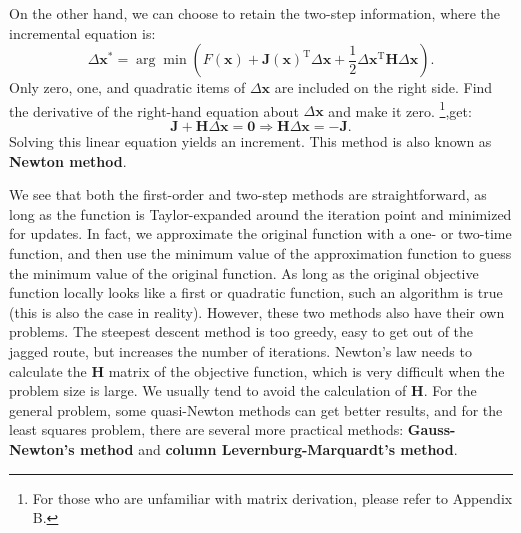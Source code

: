 On the other hand, we can choose to retain the two-step information, where the incremental equation is:
\begin{equation}
\Delta \bm{x}^* = \arg \min \left(F\left( \bm{x} \right) + \bm{J} \left( \bm{x} \right)^\mathrm{ T} \Delta \bm{x} + \frac{1}{2}\Delta {\bm{x}^\mathrm{T}}\bm{H} \Delta \bm{x} \right).
\end{equation}
Only zero, one, and quadratic items of $\Delta \bm{x}$ are included on the right side. Find the derivative of the right-hand equation about $\Delta \bm{x}$ and make it zero. \footnote{For those who are unfamiliar with matrix derivation, please refer to Appendix B. },get:
\begin{equation}
\bm{J} + \bm{H} \Delta \bm{x} = \bm{0} \Rightarrow
\bm{H} \Delta \bm{x} = -\bm{J}.
\end{equation}
Solving this linear equation yields an increment. This method is also known as \textbf{Newton method}.

We see that both the first-order and two-step methods are straightforward, as long as the function is Taylor-expanded around the iteration point and minimized for updates. In fact, we approximate the original function with a one- or two-time function, and then use the minimum value of the approximation function to guess the minimum value of the original function. As long as the original objective function locally looks like a first or quadratic function, such an algorithm is true (this is also the case in reality). However, these two methods also have their own problems. The steepest descent method is too greedy, easy to get out of the jagged route, but increases the number of iterations. Newton's law needs to calculate the $\bm{H}$ matrix of the objective function, which is very difficult when the problem size is large. We usually tend to avoid the calculation of $\bm{H}$. For the general problem, some quasi-Newton methods can get better results, and for the least squares problem, there are several more practical methods: \textbf{Gauss-Newton's method} and \textbf{column Levernburg-Marquardt's method}.


